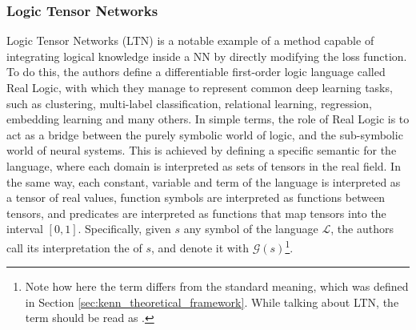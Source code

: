  \subsubsection{Logic Tensor Networks}
 Logic Tensor Networks (LTN) \cite{serafini2016logic} is a notable example of a method capable of integrating logical knowledge inside a NN by directly modifying the loss function. To do this, the authors define a differentiable first-order logic language called Real Logic, with which they manage to represent common deep learning tasks, such as clustering, multi-label classification, relational learning, regression, embedding learning and many others. 
 In simple terms, the role of Real Logic is to act as a bridge between the purely symbolic world of logic, and the sub-symbolic world of neural systems. 
This is achieved by defining a specific semantic for the language, where each domain is interpreted as sets of tensors in the real field. In the same way, each constant, variable and term of the language is interpreted as a tensor of real values, function symbols are interpreted as functions between tensors, and predicates are interpreted as functions that map tensors into the interval $[0,1]$. Specifically, given $s$ any symbol of the language $\mathcal{L}$, the authors call its interpretation the  of $s$, and denote it with $\mathcal{G}(s)$\footnote{Note how here the term  differs from the standard meaning, which was defined in Section \ref{sec:kenn_theoretical_framework}. While talking about LTN, the term  should be read as .}.
 
